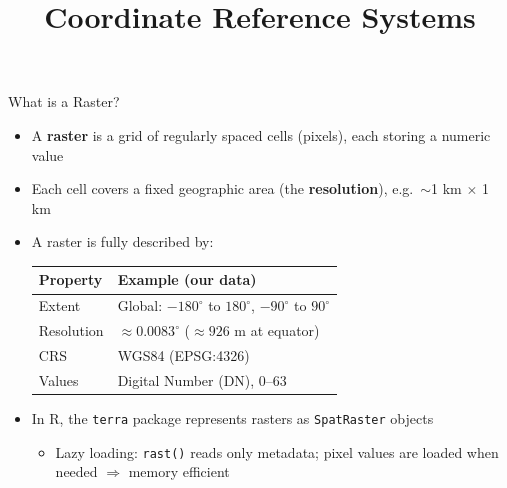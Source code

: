 \documentclass[dvipsnames,hyperref={pdfpagelabels=false}]{beamer}
\begin{document}
\begin{frame}{What is a Raster?}
\begin{itemize}
  \item A \textbf{raster} is a grid of regularly spaced cells (pixels),
        each storing a numeric value
  \vspace{0.3cm}
  \item Each cell covers a fixed geographic area (the \textbf{resolution}),
        e.g.\ $\sim$1 km $\times$ 1 km
  \vspace{0.3cm}
  \item A raster is fully described by:
  \vspace{0.15cm}
  \begin{center}
  \small
  \begin{tabular}{ll}
    \toprule
    \textbf{Property} & \textbf{Example (our data)} \\
    \midrule
    Extent   & Global: $-180^\circ$ to $180^\circ$, $-90^\circ$ to $90^\circ$ \\
    Resolution & $\approx 0.0083^\circ$ ($\approx 926$ m at equator) \\
    CRS      & WGS84 (EPSG:4326) \\
    Values   & Digital Number (DN), 0–63 \\
    \bottomrule
  \end{tabular}
  \end{center}
  \vspace{0.3cm}
  \item In R, the \texttt{terra} package represents rasters as
        \texttt{SpatRaster} objects
  \vspace{0.15cm}
  \begin{itemize}
    \item Lazy loading: \texttt{rast()} reads only metadata;
          pixel values are loaded when needed $\Rightarrow$ memory efficient
  \end{itemize}
\end{itemize}
\end{frame}


\title[]{Coordinate Reference Systems}
\author{}
\institute{}
\date{}
\begin{frame}{}
  \titlepage
\end{frame}
\end{document}
